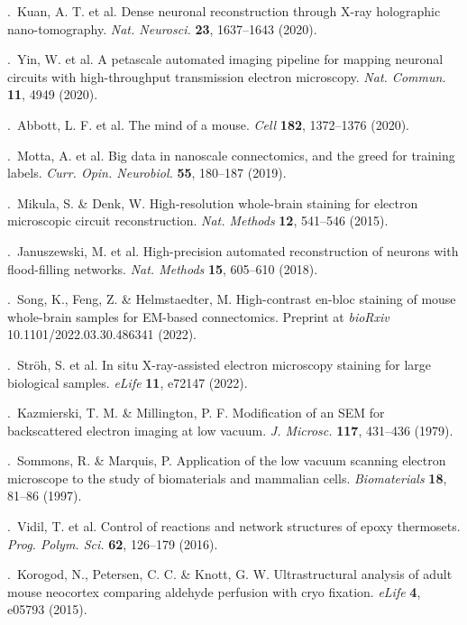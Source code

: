 \documentclass{article}
\begin{document}
.\ Kuan, A. T. et al. Dense neuronal reconstruction through X-ray holographic nano-tomography. \emph{Nat. Neurosci.} \textbf{23}, 1637–1643 (2020).\par
{}.\ Yin, W. et al. A petascale automated imaging pipeline for mapping neuronal circuits with high-throughput transmission electron microscopy. \emph{Nat. Commun.} \textbf{11}, 4949 (2020).\par
{}.\ Abbott, L. F. et al. The mind of a mouse. \emph{Cell} \textbf{182}, 1372–1376 (2020).\par
{}.\ Motta, A. et al. Big data in nanoscale connectomics, and the greed for training labels. \emph{Curr. Opin. Neurobiol.} \textbf{55}, 180–187 (2019).\par
{}.\ Mikula, S. \& Denk, W. High-resolution whole-brain staining for electron microscopic circuit reconstruction. \emph{Nat. Methods} \textbf{12}, 541–546 (2015).\par
{}.\ Januszewski, M. et al. High-precision automated reconstruction of neurons with flood-filling networks. \emph{Nat. Methods} \textbf{15}, 605–610 (2018).\par
{}.\ Song, K., Feng, Z. \& Helmstaedter, M. High-contrast en-bloc staining of mouse whole-brain samples for EM-based connectomics. Preprint at \emph{bioRxiv} 10.1101/2022.03.30.486341 (2022).\par
{}.\ Ströh, S. et al. In situ X-ray-assisted electron microscopy staining for large biological samples. \emph{eLife} \textbf{11}, e72147 (2022).\par
{}.\ Kazmierski, T. M. \& Millington, P. F. Modification of an SEM for backscattered electron imaging at low vacuum. \emph{J. Microsc.} \textbf{117}, 431–436 (1979).\par
{}.\ Sommons, R. \& Marquis, P. Application of the low vacuum scanning electron microscope to the study of biomaterials and mammalian cells. \emph{Biomaterials} \textbf{18}, 81–86 (1997).\par
{}.\ Vidil, T. et al. Control of reactions and network structures of epoxy thermosets. \emph{Prog. Polym. Sci.} \textbf{62}, 126–179 (2016).\par
{}.\ Korogod, N., Petersen, C. C. \& Knott, G. W. Ultrastructural analysis of adult mouse neocortex comparing aldehyde perfusion with cryo fixation. \emph{eLife} \textbf{4}, e05793 (2015).\par
\end{document}
